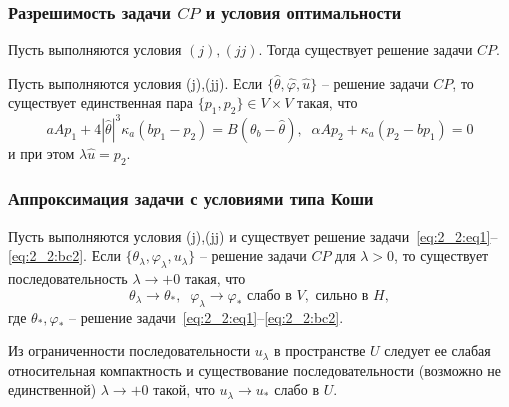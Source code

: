 \begin{frame}
    \frametitle{Разрешимость задачи $CP$ и условия оптимальности}

    \begin{theorem}
        \label{th:2_2:1}
        Пусть выполняются условия $(j), (jj)$.
        Тогда существует решение задачи $CP$.
    \end{theorem}
    \begin{theorem}
        \label{th:2_2:2}
        Пусть выполняются условия (j),(jj).
        Если $\{\hat{\theta}, \hat{\varphi}, \hat{u}\}$ -- решение задачи $CP$,
        то существует единственная пара $\{p_1, p_2 \} \in V\times V$ такая, что
        \begin{equation}
            \label{eq:2_2:as}
            aAp_1 +4|\hat{\theta}|^3 \kappa_a(bp_1 - p_2) = B(\theta_b - \hat{\theta}), \;\;
            \alpha A p_2 + \kappa_a (p_2 - b p_1)=0
        \end{equation}
        и при этом $\lambda\hat{u} = p_2$.
    \end{theorem}
\end{frame}


\begin{frame}
    \frametitle{Аппроксимация задачи с условиями типа Коши}
    \begin{theorem}
        \label{th:2_2:3}
        Пусть выполняются условия (j),(jj) и существует решение
        задачи~\eqref{eq:2_2:eq1}--\eqref{eq:2_2:bc2}.
        Если $\{\theta_\lambda,\varphi_\lambda,u_\lambda\}$ -- решение
        задачи $CP$ для $\lambda>0$, то существует последовательность $\lambda\to +0$
        такая, что
        \[
            \theta_\lambda\rightarrow\theta_*, \;\; \varphi_\lambda\rightarrow\varphi_*
            \text{ слабо в }V,\text{ сильно в }H,
        \]
        где $\theta_*,\varphi_*$ -- решение задачи~\eqref{eq:2_2:eq1}--\eqref{eq:2_2:bc2}.
    \end{theorem}


    Из ограниченности последовательности $u_\lambda$
    в пространстве $U$ следует
    ее слабая относительная компактность и существование последовательности
    (возможно не единственной) $\lambda\to+0$ такой, что
    $u_\lambda \rightarrow u_*$ слабо в $U$.

\end{frame}

